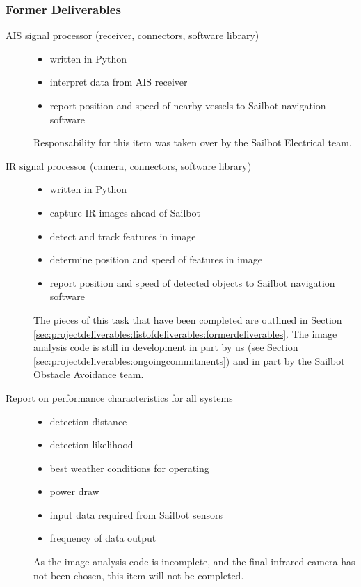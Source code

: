 \subsubsection{\label{sec:projectdeliverables:listofdeliverables:formerdeliverables}Former Deliverables}

\begin{description}
\item[AIS signal processor (receiver, connectors, software library)] \hfill
\begin{itemize}
\item written in Python
\item interpret data from AIS receiver
\item report position and speed of nearby vessels to Sailbot navigation software
\end{itemize}
Responsability for this item was taken over by the Sailbot Electrical team.

\item[IR signal processor (camera, connectors, software library)] \hfill
\begin{itemize}
\item written in Python
\item capture IR images ahead of Sailbot
\item detect and track features in image
\item determine position and speed of features in image
\item report position and speed of detected objects to Sailbot navigation software
\end{itemize}
The pieces of this task that have been completed are outlined in Section \ref{sec:projectdeliverables:listofdeliverables:formerdeliverables}. The image analysis code is still in development in part by us (see Section \ref{sec:projectdeliverables:ongoingcommitments}) and in part by the Sailbot Obstacle Avoidance team.

\item[Report on performance characteristics for all systems] \hfill
\begin{itemize}
\item detection distance
\item detection likelihood
\item best weather conditions for operating
\item power draw
\item input data required from Sailbot sensors
\item frequency of data output
\end{itemize}
As the image analysis code is incomplete, and the final infrared camera has not been chosen, this item will not be completed.
\end{description}
